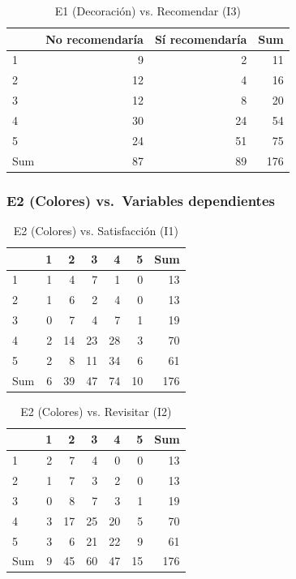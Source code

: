 \documentclass[
  spanish,
]{article}
\begin{document}
\begin{longtable}[t]{lrrr}
\caption{\label{tab:cont-e1-recom}E1 (Decoración) vs. Recomendar (I3)}\\
\toprule
 & No recomendaría & Sí recomendaría & Sum\\
\midrule
1 & 9 & 2 & 11\\
2 & 12 & 4 & 16\\
3 & 12 & 8 & 20\\
4 & 30 & 24 & 54\\
5 & 24 & 51 & 75\\
\addlinespace
Sum & 87 & 89 & 176\\
\bottomrule
\end{longtable}

\subsubsection{E2 (Colores) vs.~Variables
dependientes}\label{e2-colores-vs.-variables-dependientes}

\begin{longtable}[t]{lrrrrrr}
\caption{\label{tab:cont-e2-satisf}E2 (Colores) vs. Satisfacción (I1)}\\
\toprule
 & 1 & 2 & 3 & 4 & 5 & Sum\\
\midrule
1 & 1 & 4 & 7 & 1 & 0 & 13\\
2 & 1 & 6 & 2 & 4 & 0 & 13\\
3 & 0 & 7 & 4 & 7 & 1 & 19\\
4 & 2 & 14 & 23 & 28 & 3 & 70\\
5 & 2 & 8 & 11 & 34 & 6 & 61\\
\addlinespace
Sum & 6 & 39 & 47 & 74 & 10 & 176\\
\bottomrule
\end{longtable}

\begin{longtable}[t]{lrrrrrr}
\caption{\label{tab:cont-e2-revis}E2 (Colores) vs. Revisitar (I2)}\\
\toprule
 & 1 & 2 & 3 & 4 & 5 & Sum\\
\midrule
1 & 2 & 7 & 4 & 0 & 0 & 13\\
2 & 1 & 7 & 3 & 2 & 0 & 13\\
3 & 0 & 8 & 7 & 3 & 1 & 19\\
4 & 3 & 17 & 25 & 20 & 5 & 70\\
5 & 3 & 6 & 21 & 22 & 9 & 61\\
\addlinespace
Sum & 9 & 45 & 60 & 47 & 15 & 176\\
\bottomrule
\end{longtable}
\end{document}
